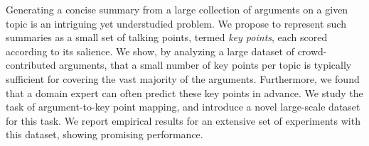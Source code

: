 Generating a concise summary from a large collection of arguments on a given topic is an intriguing yet understudied problem. We propose to represent such summaries as a small set of talking points, termed \emph{key points}, each scored according to its salience. We show, by analyzing a large dataset of crowd-contributed arguments, that a small number of key points per topic is typically sufficient for covering the vast majority of the arguments. Furthermore, we found that a domain expert can often predict these key points in advance. We study the task of argument-to-key point mapping, and introduce a novel large-scale dataset for this task. We report empirical results for an extensive set of experiments with this dataset, showing promising performance.
